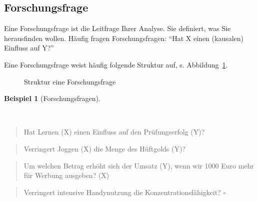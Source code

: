 \documentclass[
  letterpaper,
  twoside,
  open=any]{scrbook}
\theoremstyle{definition}
\theoremstyle{definition}
\theoremstyle{definition}
\newtheorem{example}{Beispiel}[chapter]
\theoremstyle{remark}
\begin{document}
\subsection{Forschungsfrage}\label{forschungsfrage}

Eine Forschungsfrage ist die Leitfrage Ihrer Analyse. Sie definiert, was
Sie herausfinden wollen. Häufig fragen Forschungsfragen: \enquote{Hat X
einen (kausalen) Einfluss auf Y?}

Eine Forschungsfrage weist häufig folgende Struktur auf, s.
Abbildung~\ref{fig-fo-struktur}.

\begin{figure}


\caption{\label{fig-fo-struktur}Struktur eine Forschungsfrage}

\end{figure}%

\begin{example}[Forschungsfragen]\protect\hypertarget{exm-fofrage1}{}\label{exm-fofrage1}

~

\begin{quote}
Hat Lernen (X) einen Einfluss auf den Prüfungserfolg (Y)?
\end{quote}

\begin{quote}
Verringert Joggen (X) die Menge des Hüftgolds (Y)?
\end{quote}

\begin{quote}
Um welchen Betrag erhöht sich der Umsatz (Y), wenn wir 1000 Euro mehr
für Werbung ausgeben? (X)
\end{quote}

\begin{quote}
Verringert intensive Handynutzung die Konzentrationsfähigkeit?
\(\square\)
\end{quote}

\end{example}
\end{document}
